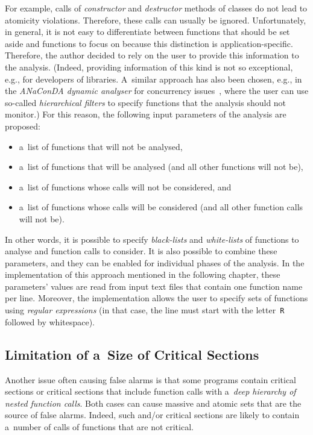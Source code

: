 For example, calls of \emph{constructor} and \emph{destructor} methods of classes do not lead to atomicity violations. Therefore, these calls can usually be ignored. Unfortunately, in general, it is not easy to differentiate between functions that should be set aside and functions to focus on because this distinction is application-specific. Therefore, the author decided to rely on the user to provide this information to the analysis. (Indeed, providing information of this kind is not so exceptional, e.g., for developers of libraries. A~similar approach has also been chosen, e.g., in the \emph{ANaConDA dynamic analyser} for concurrency issues~\cite{anaconda}, where the user can use so-called \emph{hierarchical filters} to specify functions that the analysis should not monitor.) For this reason, the following input parameters of the analysis are proposed:
\begin{itemize}
    \item a~list of functions that will not be analysed,

    \item a~list of functions that will be analysed (and all other functions will not be),

    \item a~list of functions whose calls will not be considered, and

    \item a~list of functions whose calls will be considered (and all other function calls will not be).
\end{itemize}
In other words, it is possible to specify \emph{black-lists} and \emph{white-lists} of functions to analyse and function calls to consider. It is also possible to combine these parameters, and they can be enabled for individual phases of the analysis. In the implementation of this approach mentioned in the following chapter, these parameters' values are read from input text files that contain one function name per line. Moreover, the implementation allows the user to specify sets of functions using \emph{regular expressions} (in that case, the line must start with the letter~\texttt{R} followed by whitespace).

\subsection{Limitation of a~Size of Critical Sections}

Another issue often causing false alarms is that some programs contain  critical sections or critical sections that include function calls with a~\emph{deep hierarchy of nested function calls}. Both cases can cause massive and  atomic sets that are the source of false alarms. Indeed, such  and/or  critical sections are likely to contain a~number of calls of functions that are not critical.

